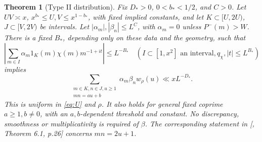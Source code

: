 \documentclass[11pt]{article}
\newtheorem{theorem}{Theorem}[section]
\theoremstyle{definition}
\theoremstyle{definition}
\begin{document}
\begin{theorem}[Type II distribution]\label{thm:typeii}
Fix \(D_*>0\), \(0<b_*<1/2\), and \(C>0\). Let \(UV\asymp x\), \(x^{b_*}\le U,V\le x^{1-b_*}\), with fixed implied constants, and let \(K\subset[U,2U)\), \(J\subset[V,2V)\) be intervals. Let \(|\alpha_m|,|\beta_n|\le L^C\), with \(\alpha_m=0\) unless \(P^-(m)>W\). There is a fixed \(B_*\), depending only on these data and the geometry, such that
\begin{equation}
\left|\sum_{m\in I}\alpha_m1_K(m)\chi(m)m^{-1+it}\right|
 \le L^{-B_*}\quad(I\subset[1,x^2]\text{ an interval},
                         q_\chi,|t|\le L^{B_*})          \tag{4.1}\label{eq:4-1}
\end{equation}
implies
\begin{equation}
\sum_{\substack{m\in K,n\in J,u\ge1\\mn=au+b}}
       \alpha_m\beta_nw_\rho(u)\ll xL^{-D_*}.             \tag{4.2}\label{eq:4-2}
\end{equation}
This is uniform in \eqref{eq:U} and \(\rho\). It also holds for general fixed coprime \(a\ge1,b\ne0\), with an \(a,b\)-dependent threshold and constant. No discrepancy, smoothness or multiplicativity is required of \(\beta\). The corresponding statement in [, Theorem 6.1, p.26] concerns \(mn=2u+1\).

\end{theorem}
\end{document}

